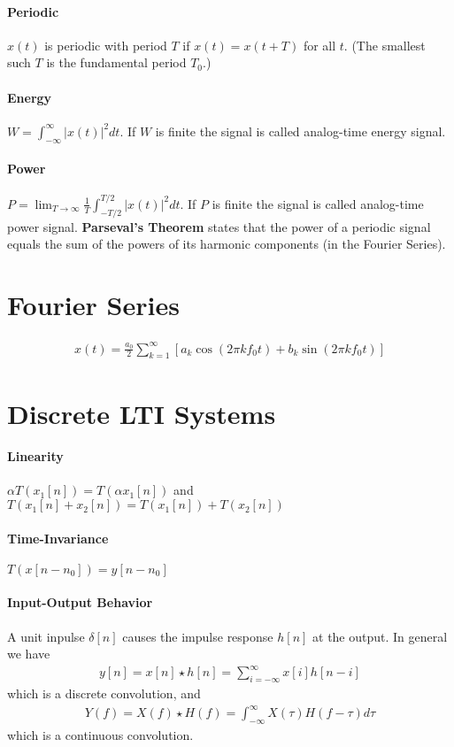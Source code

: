 \documentclass{article}
\begin{document}
\begin{multicols}{2}
    \paragraph{Periodic} $x(t)$ is periodic with period $T$ if $x(t) = x(t + T)$ for all $t$. (The smallest such $T$ is the fundamental period $T_0$.)

    \paragraph{Energy} $W = \int_{-\infty}^{\infty} |x(t)|^2 dt$. If $W$ is finite the signal is called analog-time energy signal.

    \paragraph{Power} $P = \lim_{T \to \infty} \frac{1}{T} \int_{-T/2}^{T/2} |x(t)|^2 dt$. If $P$ is finite the signal is called analog-time power signal. \textbf{Parseval's Theorem} states that the power of a periodic signal equals the sum of the powers of its harmonic components (in the Fourier Series).

    \section*{Fourier Series}

    \begin{align*}
        x(t) = \frac{a_0}{2} \sum_{k = 1}^{\infty} \left[ a_k \cos(2\pi k f_0 t) + b_k \sin(2\pi k f_0 t) \right]
    \end{align*}

    \section*{Discrete LTI Systems}

    \paragraph{Linearity} $\alpha T(x_1[n]) = T(\alpha x_1[n])$ and $T(x_1[n] + x_2[n]) = T(x_1[n]) + T(x_2[n])$

    \paragraph{Time-Invariance} $T(x[n - n_0]) = y[n - n_0]$

    \paragraph{Input-Output Behavior} A unit inpulse $\delta[n]$ causes the impulse response $h[n]$ at the output. In general we have
    \begin{align*}
        y[n] = x[n] \star h[n] = \sum_{i = -\infty}^{\infty} x[i] h[n - i]
    \end{align*}
    which is a discrete convolution, and
    \begin{align*}
        Y(f) = X(f) \star H(f) = \int_{-\infty}^{\infty} X(\tau) H(f - \tau) d\tau
    \end{align*}
    which is a continuous convolution.


\end{multicols}
\end{document}
